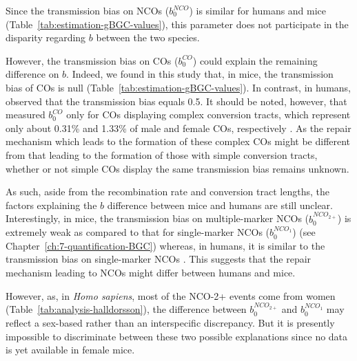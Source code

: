 \begin{mccorrection}

Since the transmission bias on NCOs ($b_0^{NCO}$) is similar for humans and mice (Table~\ref{tab:estimation-gBGC-values}), this parameter does not participate in the disparity regarding $b$ between the two species.

However, the transmission bias on COs ($b_0^{CO}$) could explain the remaining difference on $b$.
Indeed, we found in this study that, in mice, the transmission bias of COs is null (Table~\ref{tab:estimation-gBGC-values}).
In contrast, in humans, \citet{halldorsson2016rate} observed that the transmission bias equals 0.5.
It should be noted, however, that \citet{halldorsson2016rate} measured $b_0^{CO}$ only for COs displaying complex conversion tracts, which represent only about 0.31\% and 1.33\% of male and female COs, respectively \citep{webb2008sperm, halldorsson2016rate}.
As the repair mechanism which leads to the formation of these complex COs might be different from that leading to the formation of those with simple conversion tracts, whether or not simple COs display the same transmission bias remains unknown.

As such, aside from the recombination rate and conversion tract lengths, the factors explaining the $b$ difference between mice and humans are still unclear.\\

Interestingly, in mice, the transmission bias on multiple-marker NCOs ($b_0^{NCO_{2+}}$) is extremely weak as compared to that for single-marker NCOs ($b_0^{NCO_{1}}$) (see Chapter~\ref{ch:7-quantification-BGC}) whereas, in humans, it is similar to the transmission bias on single-marker NCOs \citep{halldorsson2016rate}.
This suggests that the repair mechanism leading to NCOs might differ between humans and mice.

However, as, in \textit{Homo sapiens}, most of the NCO-2+ events come from women (Table~\ref{tab:analysis-halldorsson}), the difference between $b_0^{NCO_{2+}}$ and $b_0^{NCO_{1}}$ may reflect a sex-based rather than an interspecific discrepancy.
But it is presently impossible to discriminate between these two possible explanations since no data is yet available in female mice.



\end{mccorrection}



